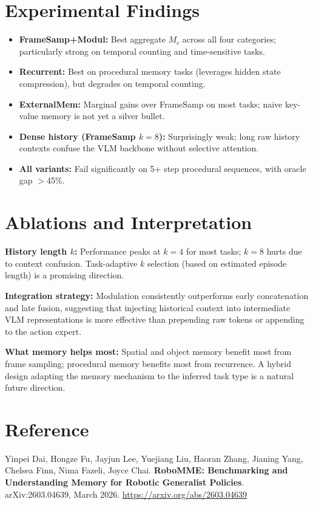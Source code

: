 \documentclass[10pt,twocolumn]{article}
\begin{document}
\section{Experimental Findings}

\begin{itemize}[itemsep=2pt,parsep=0pt]
  \item \textbf{FrameSamp+Modul:} Best aggregate $M_c$ across all four
    categories; particularly strong on temporal counting and time-sensitive tasks.
  \item \textbf{Recurrent:} Best on procedural memory tasks (leverages
    hidden state compression), but degrades on temporal counting.
  \item \textbf{ExternalMem:} Marginal gains over FrameSamp on most tasks;
    naive key-value memory is not yet a silver bullet.
  \item \textbf{Dense history (FrameSamp $k=8$):} Surprisingly weak;
    long raw history contexts confuse the VLM backbone without selective
    attention.
  \item \textbf{All variants:} Fail significantly on 5+ step procedural
    sequences, with oracle gap $>$45\%.
\end{itemize}

\section{Ablations and Interpretation}

\textbf{History length $k$:} Performance peaks at $k=4$ for most tasks;
$k=8$ hurts due to context confusion. Task-adaptive $k$ selection (based
on estimated episode length) is a promising direction.

\textbf{Integration strategy:} Modulation consistently outperforms early
concatenation and late fusion, suggesting that injecting historical context
into intermediate VLM representations is more effective than prepending raw
tokens or appending to the action expert.

\textbf{What memory helps most:} Spatial and object memory benefit most
from frame sampling; procedural memory benefits most from recurrence.
A hybrid design adapting the memory mechanism to the inferred task type
is a natural future direction.

\section*{Reference}

Yinpei Dai, Hongze Fu, Jayjun Lee, Yuejiang Liu, Haoran Zhang, Jianing Yang,
Chelsea Finn, Nima Fazeli, Joyce Chai.
\textbf{RoboMME: Benchmarking and Understanding Memory for
Robotic Generalist Policies}.
arXiv:2603.04639, March 2026.
\url{https://arxiv.org/abs/2603.04639}
\end{document}
